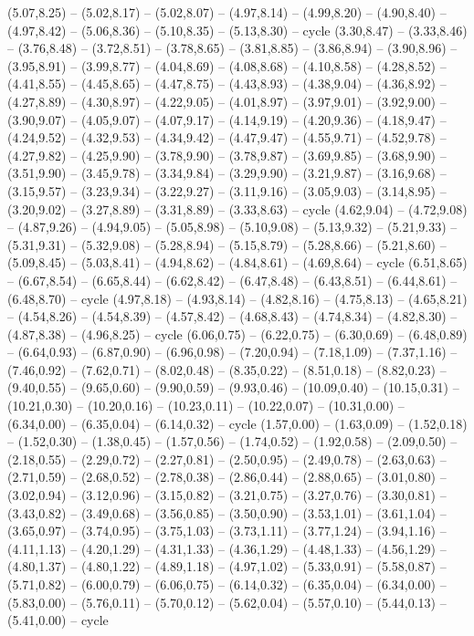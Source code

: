 \expandafter\def\csname geo:gebiet:1938-Denmark\endcsname{
  (5.07,8.25) -- (5.02,8.17) -- (5.02,8.07) -- (4.97,8.14) -- (4.99,8.20) -- (4.90,8.40) -- (4.97,8.42) -- (5.06,8.36) -- (5.10,8.35) -- (5.13,8.30) -- cycle
  (3.30,8.47) -- (3.33,8.46) -- (3.76,8.48) -- (3.72,8.51) -- (3.78,8.65) -- (3.81,8.85) -- (3.86,8.94) -- (3.90,8.96) -- (3.95,8.91) -- (3.99,8.77) -- (4.04,8.69) -- (4.08,8.68) -- (4.10,8.58) -- (4.28,8.52) -- (4.41,8.55) -- (4.45,8.65) -- (4.47,8.75) -- (4.43,8.93) -- (4.38,9.04) -- (4.36,8.92) -- (4.27,8.89) -- (4.30,8.97) -- (4.22,9.05) -- (4.01,8.97) -- (3.97,9.01) -- (3.92,9.00) -- (3.90,9.07) -- (4.05,9.07) -- (4.07,9.17) -- (4.14,9.19) -- (4.20,9.36) -- (4.18,9.47) -- (4.24,9.52) -- (4.32,9.53) -- (4.34,9.42) -- (4.47,9.47) -- (4.55,9.71) -- (4.52,9.78) -- (4.27,9.82) -- (4.25,9.90) -- (3.78,9.90) -- (3.78,9.87) -- (3.69,9.85) -- (3.68,9.90) -- (3.51,9.90) -- (3.45,9.78) -- (3.34,9.84) -- (3.29,9.90) -- (3.21,9.87) -- (3.16,9.68) -- (3.15,9.57) -- (3.23,9.34) -- (3.22,9.27) -- (3.11,9.16) -- (3.05,9.03) -- (3.14,8.95) -- (3.20,9.02) -- (3.27,8.89) -- (3.31,8.89) -- (3.33,8.63) -- cycle
  (4.62,9.04) -- (4.72,9.08) -- (4.87,9.26) -- (4.94,9.05) -- (5.05,8.98) -- (5.10,9.08) -- (5.13,9.32) -- (5.21,9.33) -- (5.31,9.31) -- (5.32,9.08) -- (5.28,8.94) -- (5.15,8.79) -- (5.28,8.66) -- (5.21,8.60) -- (5.09,8.45) -- (5.03,8.41) -- (4.94,8.62) -- (4.84,8.61) -- (4.69,8.64) -- cycle
  (6.51,8.65) -- (6.67,8.54) -- (6.65,8.44) -- (6.62,8.42) -- (6.47,8.48) -- (6.43,8.51) -- (6.44,8.61) -- (6.48,8.70) -- cycle
  (4.97,8.18) -- (4.93,8.14) -- (4.82,8.16) -- (4.75,8.13) -- (4.65,8.21) -- (4.54,8.26) -- (4.54,8.39) -- (4.57,8.42) -- (4.68,8.43) -- (4.74,8.34) -- (4.82,8.30) -- (4.87,8.38) -- (4.96,8.25) -- cycle}
\expandafter\def\csname geo:gebiet:1938-Yugoslavia\endcsname{
  (6.06,0.75) -- (6.22,0.75) -- (6.30,0.69) -- (6.48,0.89) -- (6.64,0.93) -- (6.87,0.90) -- (6.96,0.98) -- (7.20,0.94) -- (7.18,1.09) -- (7.37,1.16) -- (7.46,0.92) -- (7.62,0.71) -- (8.02,0.48) -- (8.35,0.22) -- (8.51,0.18) -- (8.82,0.23) -- (9.40,0.55) -- (9.65,0.60) -- (9.90,0.59) -- (9.93,0.46) -- (10.09,0.40) -- (10.15,0.31) -- (10.21,0.30) -- (10.20,0.16) -- (10.23,0.11) -- (10.22,0.07) -- (10.31,0.00) -- (6.34,0.00) -- (6.35,0.04) -- (6.14,0.32) -- cycle}
\expandafter\def\csname geo:gebiet:1938-Italy\endcsname{
  (1.57,0.00) -- (1.63,0.09) -- (1.52,0.18) -- (1.52,0.30) -- (1.38,0.45) -- (1.57,0.56) -- (1.74,0.52) -- (1.92,0.58) -- (2.09,0.50) -- (2.18,0.55) -- (2.29,0.72) -- (2.27,0.81) -- (2.50,0.95) -- (2.49,0.78) -- (2.63,0.63) -- (2.71,0.59) -- (2.68,0.52) -- (2.78,0.38) -- (2.86,0.44) -- (2.88,0.65) -- (3.01,0.80) -- (3.02,0.94) -- (3.12,0.96) -- (3.15,0.82) -- (3.21,0.75) -- (3.27,0.76) -- (3.30,0.81) -- (3.43,0.82) -- (3.49,0.68) -- (3.56,0.85) -- (3.50,0.90) -- (3.53,1.01) -- (3.61,1.04) -- (3.65,0.97) -- (3.74,0.95) -- (3.75,1.03) -- (3.73,1.11) -- (3.77,1.24) -- (3.94,1.16) -- (4.11,1.13) -- (4.20,1.29) -- (4.31,1.33) -- (4.36,1.29) -- (4.48,1.33) -- (4.56,1.29) -- (4.80,1.37) -- (4.80,1.22) -- (4.89,1.18) -- (4.97,1.02) -- (5.33,0.91) -- (5.58,0.87) -- (5.71,0.82) -- (6.00,0.79) -- (6.06,0.75) -- (6.14,0.32) -- (6.35,0.04) -- (6.34,0.00) -- (5.83,0.00) -- (5.76,0.11) -- (5.70,0.12) -- (5.62,0.04) -- (5.57,0.10) -- (5.44,0.13) -- (5.41,0.00) -- cycle}
